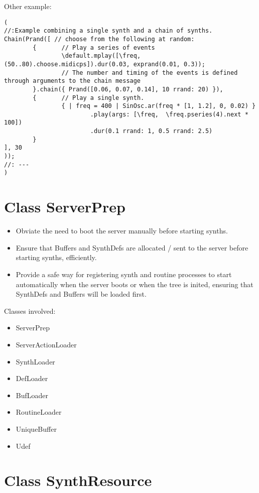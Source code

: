 \documentclass[11pt, a4paper]{scrartcl}
\begin{document}
Other example: 

\begin{verbatim}
(
//:Example combining a single synth and a chain of synths.
Chain(Prand([ // choose from the following at random:
        {       // Play a series of events
                \default.mplay([\freq, (50..80).choose.midicps]).dur(0.03, exprand(0.01, 0.3));
                // The number and timing of the events is defined through arguments to the chain message
        }.chain({ Prand([0.06, 0.07, 0.14], 10 rrand: 20) }),
        {       // Play a single synth.
                { | freq = 400 | SinOsc.ar(freq * [1, 1.2], 0, 0.02) }
                        .play(args: [\freq,  \freq.pseries(4).next * 100])
                        .dur(0.1 rrand: 1, 0.5 rrand: 2.5) 
        }
], 30
));
//: ---
)
\end{verbatim}
\section*{Class ServerPrep}
\label{sec-13}


\begin{itemize}
\item Obviate the need to boot the server manually before starting synths.
\item Ensure that Buffers and SynthDefs are allocated / sent to the server
  before starting synths, efficiently.
\item Provide a safe way for registering synth and routine processes to start automatically when the server boots
  or when the tree is inited, ensuring that SynthDefs and Buffers will be loaded first.
\end{itemize}

Classes involved: 

\begin{itemize}
\item ServerPrep
\item ServerActionLoader
\item SynthLoader
\item DefLoader
\item BufLoader
\item RoutineLoader
\item UniqueBuffer
\item Udef
\end{itemize}
\section*{Class SynthResource}
\label{sec-14}
\end{document}
